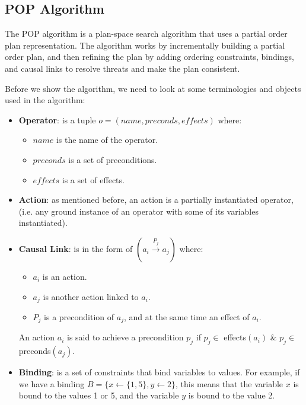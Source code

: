 \subsection{POP Algorithm}
The \acf{POP} algorithm is a plan-space search algorithm that uses a partial order plan representation.
The algorithm works by incrementally building a partial order plan, and then refining the plan by adding ordering constraints,
bindings, and causal links to resolve threats and make the plan consistent.

Before we show the algorithm, we need to look at some terminologies and objects used in the algorithm:
\begin{itemize}
  \item \textbf{Operator}: is a tuple $o = (name, preconds, effects)$ where:
        \begin{itemize}
          \item $name$ is the name of the operator.
          \item $preconds$ is a set of preconditions.
          \item $effects$ is a set of effects.
        \end{itemize}
  \item \textbf{Action}: as mentioned before, an action is a partially instantiated operator,
        (i.e. any ground instance of an operator with some of its variables instantiated).

  \item \textbf{Causal Link}: is in the form of $(a_i \xrightarrow{\text{$P_j$}} a_j)$ where:
        \begin{itemize}
          \item $a_i$ is an action.
          \item $a_j$ is another action linked to $a_i$.
          \item $P_j$ is a precondition of $a_j$, and at the same time an effect of $a_i$.
        \end{itemize}
        An action $a_i$ is said to achieve a precondition $p_j$ if $p_j \in$ effects$(a_i)$ \& $p_j \in$ preconds$(a_j)$.

  \item \textbf{Binding}: is a set of constraints that bind variables to values.
        For example, if we have a binding $B = \{x \leftarrow \{1,5\}, y \leftarrow 2\}$, this means that the variable $x$ is bound to the values 1 or 5,
        and the variable $y$ is bound to the value 2.

\end{itemize}

